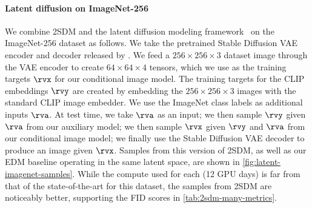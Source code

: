 
\paragraph{Latent diffusion on ImageNet-256}
We combine 2SDM and the latent diffusion modeling framework~\citep{rombach2022high} on the ImageNet-256 dataset as follows. We take the pretrained Stable Diffusion VAE encoder and decoder released by \citet{rombach2022high}. We feed a $256\times256\times3$ dataset image through the VAE encoder to create $64\times64\times4$ tensors, which we use as the training targets $\rvx$ for our conditional image model. The training targets for the CLIP embeddings $\rvy$ are created by embedding the $256\times256\times3$ images with the standard CLIP image embedder. We use the ImageNet class labels as additional inputs $\rva$. At test time, we take $\rva$ as an input; we then sample $\rvy$ given $\rva$ from our auxiliary model; we then sample $\rvx$ given $\rvy$ and $\rva$ from our conditional image model; we finally use the Stable Diffusion VAE decoder to produce an image given $\rvx$. Samples from this version of 2SDM, as well as our EDM baseline operating in the same latent space, are shown in \cref{fig:latent-imagenet-samples}. While the compute used for each (12 GPU days) is far from that of the state-of-the-art for this dataset, the samples from 2SDM are noticeably better, supporting the FID scores in \cref{tab:2sdm-many-metrics}.

